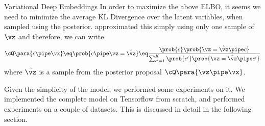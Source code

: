 \documentclass{article}
\begin{document}
\begin{psection}{Variational Deep Embeddings}
	In order to maximize the above ELBO, it seems we need to minimize the average KL Divergence over the latent variables, when sampled using the posterior.  approximated this simply using only one sample of $\vz$ and therefore, we can write 
	\begin{align*}
		\cQ\para{c \pipe \vx} \eq \prob{c \pipe \vz = \hat{\vz}} \eq \frac{\prob{c} \prob{\vz = \hat{\vz} \pipe c}}{\sum_{c' = 1}^{K} \prob{c'} \prob{\vz = \hat{\vz} \pipe c'}}
	\end{align*}
	where $\hat{\vz}$ is a sample from the posterior proposal $\cQ\para{\vz \pipe \vx}$.

	Given the simplicity of the model, we performed some experiments on it. We implemented the complete model on Tensorflow from scratch, and performed experiments on a couple of datasets. This is discussed in detail in the following section.
\end{psection}
\end{document}
